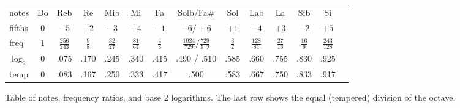 \begin{figure}
    \begin{center}
        \setlength{\tabcolsep}{1mm}%
        \begin{tabular}{@{}l|ccccccccccccc@{}}
                        notes   &   Do   &   Reb           &   Re     &    Mib
            &   Mi          &    Fa    &  Solb/Fa\#                       &
            Sol    &  Lab           &   La          &   Sib         &   Si
            \\
                        fifths &   $0$  &  $-5$           &  $+2$    &    $-3$
            &  $+4$         &   $-1$   &  $-6/+6$                         &
            $+1$    &  $-4$          &  $+3$         &  $-2$         &  $+5$
            \\
                        freq   &   $1$  &$\frac{256}{243}$&$\frac
            98$&$\frac{32}{27}$&$\frac{81}{64}$&$\frac
            43$&$\frac{1024}{729}/\frac{729}{512}$&$\frac
            32$&$\frac{128}{81}$&$\frac{27}{16}$&$\frac{16}9$
            &$\frac{243}{128}$\\
                $\log_2$   &\small 0&\small .075 &\small  .170& \small  .245&
        \small  .340 & \small  .415& \small  .490 / .510         &\small
        .585&\small  .660&\small  .755  &\small  .830  &\small  .925    \\
                            temp &\small 0&\small .083 &\small  .167& \small
              .250& \small  .333 & \small  .417& \small  .500
              &\small  .583&\small  .667&\small  .750  &\small  .833  &\small
              .917    \\
        \end{tabular}
    \end{center}
    \caption{Table of notes, frequency ratios, and base 2 logarithms. The last row shows the equal (tempered) division of the octave.}
\end{figure}

